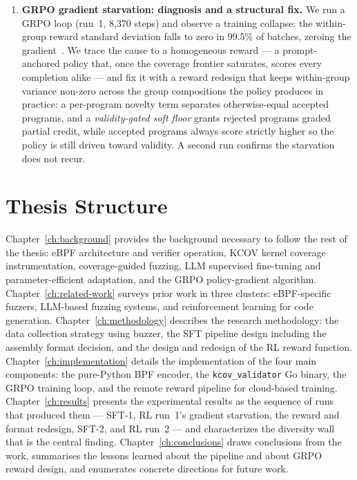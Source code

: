 \begin{enumerate}
  \item \textbf{GRPO gradient starvation: diagnosis and a structural fix.}
        We run a GRPO loop (run~1, 8{,}370 steps) and observe a training collapse:
        the within-group reward standard deviation falls to zero in 99.5\% of
        batches, zeroing the gradient~\cite{grpo-starvation}. We trace the cause to a
        homogeneous reward --- a prompt-anchored policy that, once the coverage
        frontier saturates, scores every completion alike --- and fix it with a
        reward redesign that keeps within-group variance non-zero across the group
        compositions the policy produces in practice: a per-program novelty term
        separates otherwise-equal accepted
        programs, and a \emph{validity-gated soft floor} grants rejected programs
        graded partial credit, while accepted programs always score strictly higher
        so the policy is still driven toward validity. A second run confirms the
        starvation does not recur.

\end{enumerate}

\section{Thesis Structure}
\label{sec:structure}

Chapter~\ref{ch:background} provides the background necessary to follow the rest
of the thesis: eBPF architecture and verifier operation, KCOV kernel coverage
instrumentation, coverage-guided fuzzing, LLM supervised fine-tuning and
parameter-efficient adaptation, and the GRPO policy-gradient algorithm.
Chapter~\ref{ch:related-work} surveys prior work in three clusters: eBPF-specific
fuzzers, LLM-based fuzzing systems, and reinforcement learning for code generation.
Chapter~\ref{ch:methodology} describes the research methodology: the data
collection strategy using buzzer, the SFT pipeline design including the assembly
format decision, and the design and redesign of the RL reward function.
Chapter~\ref{ch:implementation} details the implementation of the four main
components: the pure-Python BPF encoder, the \texttt{kcov\_validator} Go binary,
the GRPO training loop, and the remote reward pipeline for cloud-based training.
Chapter~\ref{ch:results} presents the experimental results as the sequence of runs
that produced them --- SFT-1, RL run~1's gradient starvation, the reward and format
redesign, SFT-2, and RL run~2 --- and characterizes the diversity wall that is the
central finding.
Chapter~\ref{ch:conclusions} draws conclusions from the work, summarises the
lessons learned about the pipeline and about GRPO reward design, and enumerates
concrete directions for future work.
